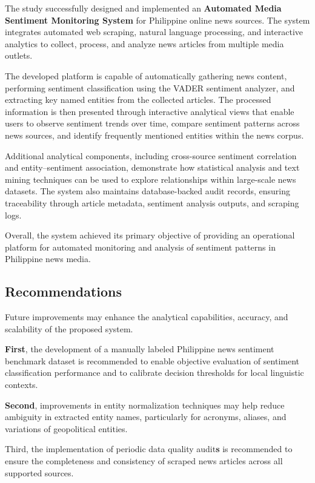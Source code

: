 The study successfully designed and implemented an \textbf{Automated Media Sentiment Monitoring System} for Philippine online news sources. The system integrates automated web scraping, natural language processing, and interactive analytics to collect, process, and analyze news articles from multiple media outlets.

The developed platform is capable of automatically gathering news content, performing sentiment classification using the VADER sentiment analyzer, and extracting key named entities from the collected articles. The processed information is then presented through interactive analytical views that enable users to observe sentiment trends over time, compare sentiment patterns across news sources, and identify frequently mentioned entities within the news corpus.

Additional analytical components, including cross-source sentiment correlation and entity--sentiment association, demonstrate how statistical analysis and text mining techniques can be used to explore relationships within large-scale news datasets. The system also maintains database-backed audit records, ensuring traceability through article metadata, sentiment analysis outputs, and scraping logs.

Overall, the system achieved its primary objective of providing an operational platform for automated monitoring and analysis of sentiment patterns in Philippine news media.

\subsection{\texorpdfstring{\textbf{Recommendations}}{Recommendations}}\label{recommendations}

Future improvements may enhance the analytical capabilities, accuracy, and scalability of the proposed system.

\textbf{First}, the development of a manually labeled Philippine news sentiment benchmark dataset is recommended to enable objective evaluation of sentiment classification performance and to calibrate decision thresholds for local linguistic contexts.

\textbf{Second}, improvements in entity normalization techniques may help reduce ambiguity in extracted entity names, particularly for acronyms, aliases, and variations of geopolitical entities.

Third, the implementation of periodic data quality audit\textbf{s} is recommended to ensure the completeness and consistency of scraped news articles across all supported sources.

